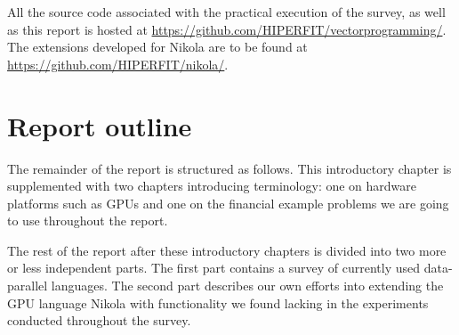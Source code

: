 





%
%

All the source code associated with the practical execution of the survey, as well as this report is hosted at
\url{https://github.com/HIPERFIT/vectorprogramming/}.
The extensions developed for Nikola are to be found at \url{https://github.com/HIPERFIT/nikola/}.

\section{Report outline}
The remainder of the report is structured as follows. This
introductory chapter is supplemented with two chapters introducing
terminology: one on hardware platforms such as GPUs and one on the
financial example problems we are going to use throughout the
report.

The rest of the report after these introductory chapters is divided
into two more or less independent parts. The first part contains a
survey of currently used data-parallel languages. The second part
describes our own efforts into extending the GPU language Nikola with
functionality we found lacking in the experiments conducted throughout
the survey.



